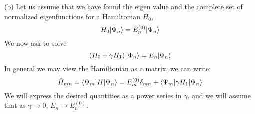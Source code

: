 \begin{homeworkProblem}
\begin{homeworkSection}{(b)}
Let us assume that we have found the eigen value and the complete set of normalized eigenfunctions for a Hamiltonian $H_0$,
\begin{equation}
H_0|\Psi_n\rangle=E_n^{(0)}|\Psi_n\rangle
\end{equation}
We now ask to solve
\begin{equation}\label{P5-10}
\left(H_0+\gamma H_1\right)|\Phi_n\rangle=E_n|\Phi_n\rangle
\end{equation}
In general we may view the Hamiltonian as a matrix, we can write:
\begin{equation}
\Hat{H}_{mn}=\langle \Psi_m|H|\Psi_n\rangle=E_{m}^{(0)}\delta_{mn}+\langle \Psi_m|\gamma H_1|\Psi_n\rangle
\end{equation}
We will express the desired quantities as a power series in $\gamma$. and we will assume that as $\gamma\rightarrow 0$,
$E_n\rightarrow E_n^{(0)}$.


\end{homeworkSection}
\end{homeworkProblem}
